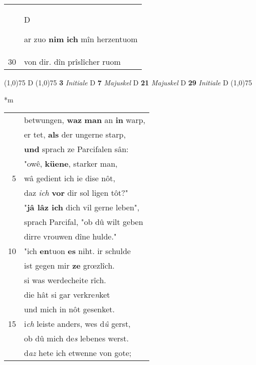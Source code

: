 \documentclass[8pt,a4paper,notitlepage]{article}
\begin{document}
\begin{table}[ht]
\begin{minipage}[t]{0.5\linewidth}
\begin{tabular}{rl}
 & \begin{large}D\end{large}ar zuo \textbf{nim} \textbf{ich} mîn herzentuom\\ 
30 & von dir. dîn prîslîcher ruom\\ 
\end{tabular}
\scriptsize
\line(1,0){75} \newline
D \newline
\line(1,0){75} \newline
\textbf{3} \textit{Initiale} D  \textbf{7} \textit{Majuskel} D  \textbf{21} \textit{Majuskel} D  \textbf{29} \textit{Initiale} D  \newline
\line(1,0){75} \newline
\newline
\end{minipage}
\hspace{0.5cm}
\begin{minipage}[t]{0.5\linewidth}
\small
\begin{center}*m
\end{center}
\begin{tabular}{rl}
 & betwungen, \textbf{waz} \textbf{man} an \textbf{in} warp,\\ 
 & er tet, \textbf{als} der ungerne starp,\\ 
 & \textbf{und} sprach ze Parcifalen sân:\\ 
 & "owê, \textbf{küene}, starker man,\\ 
5 & wâ gedient ich ie dise nôt,\\ 
 & daz \textit{ich} \textbf{vor} dir sol ligen tôt?"\\ 
 & "\textbf{jâ lâz ich} dich vil gerne leben",\\ 
 & sprach Parcifal, "ob dû wilt geben\\ 
 & dirre vrouwen dîne hulde."\\ 
10 & "ich \textbf{en}tuon \textbf{es} niht. ir schulde\\ 
 & ist gegen mir \textbf{ze} grœzlîch.\\ 
 & si was werdecheite rîch.\\ 
 & die hât si gar verkre\textit{n}ket\\ 
 & und mich in nôt gesenket.\\ 
15 & i\textit{ch} leiste anders, wes d\textit{û} gerst,\\ 
 & ob dû mich de\textit{s} lebenes werst.\\ 
 & d\textit{az} hete ich etwenne von gote;\\ 

\end{tabular}
\end{minipage}
\end{table}
\end{document}

